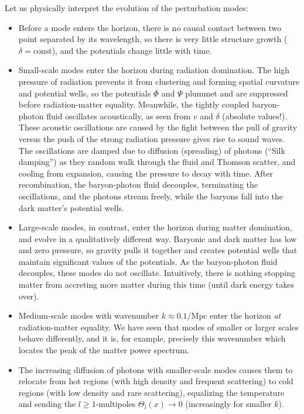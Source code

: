 \documentclass[10pt,a4paper]{article}
\begin{document}
Let us physically interpret the evolution of the perturbation modes:
\begin{itemize}

\item
Before a mode enters the horizon,
there is no causal contact between two point separated by its wavelength,
so there is very little structure growth ($\delta = \textrm{const}$), and the potentials change little with time.

\item
Small-scale modes enter the horizon during radiation domination.
The high pressure of radiation prevents it from clustering and forming spatial curvature and potential wells,
so the potentials $\Phi$ and $\Psi$ plummet and are suppressed before radiation-matter equality.
Meanwhile, the tightly coupled baryon-photon fluid oscillates acoustically, as seen from $v$ and $\delta$ (absolute values!).
These acoustic oscillations are caused by the fight between the pull of gravity versus the push of the strong radiation pressure gives rise to sound waves.
The oscillations are damped due to diffusion (spreading) of photons (``Silk damping'') as they random walk through the fluid and Thomson scatter, and cooling from expansion, causing the pressure to decay with time.
After recombination, the baryon-photon fluid decouples, terminating the oscillations,
and the photons stream freely, while the baryons fall into the dark matter's potential wells.

\item
Large-scale modes, in contrast, enter the horizon during matter domination, and evolve in a qualitatively different way.
Baryonic and dark matter has low and zero pressure,
so gravity pulls it together and creates potential wells that maintain significant values of the potentials.
As the baryon-photon fluid decouples, these modes do not oscillate.
Intuitively, there is nothing stopping matter from accreting more matter during this time (until dark energy takes over).

\item
Medium-scale modes with wavenumber $k \approx 0.1 / \textrm{Mpc}$ enter the horizon \emph{at} radiation-matter equality.
We have seen that modes of smaller or larger scales behave differently,
and it is, for example, precisely this wavenumber which locates the peak of the matter power spectrum.

\item
The increasing diffusion of photons with smaller-scale modes
causes them to relocate
from hot regions (with high density and frequent scattering)
to cold regions (with low density and rare scattering),
equalizing the temperature and sending the $l \geq 1$-multipoles $\Theta_l(x) \rightarrow 0$ (increasingly for smaller $k$).


\end{itemize}
\end{document}
